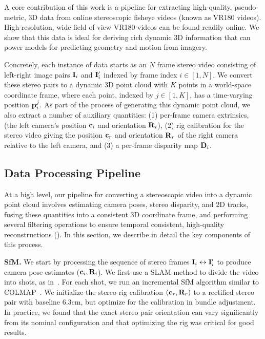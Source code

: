 A core contribution of this work is a pipeline for extracting high-quality, pseudo-metric, 3D data from online stereoscopic fisheye videos (known as VR180 videos). 
High-resolution, wide field of view VR180 videos can be found readily online.
We show that this data is ideal for deriving rich dynamic 3D information that can power models for predicting geometry and motion from imagery.

Concretely, each instance of data starts as an $N$ frame stereo video consisting of left-right image pairs $\mathbf{I}_i$ and $\mathbf{I}'_i$ indexed by frame index $i\in[1,N]$. We convert these stereo pairs to a dynamic 3D point cloud with $K$ points in a world-space coordinate frame, where each point, indexed by $j\in[1,K]$, has a time-varying position $\mathbf{p}_i^j$. 
As part of the process of generating this dynamic point cloud, we also extract a number of auxiliary quantities: (1) per-frame camera extrinsics, (the left camera's position $\mathbf{c}_i$ and orientation $\mathbf{R}_i$), (2) rig calibration for the stereo video giving the position $\mathbf{c}_r$ and orientation $\mathbf{R}_r$ of the right camera relative to the left camera, and (3) a per-frame disparity map $\mathbf{D}_i$.


\subsection{Data Processing Pipeline} 

At a high level, our pipeline for converting a stereoscopic video into a dynamic point cloud involves estimating camera poses, stereo disparity, and 2D tracks, fusing these quantities into a consistent 3D coordinate frame, and performing several filtering operations to ensure temporal consistent, high-quality reconstructions (). In this section, we describe in detail the key components of this process. %


\medskip
\noindent \textbf{SfM.} 
We start by processing the sequence of stereo frames $\mathbf{I}_i \leftrightarrow \mathbf{I}_i'$ to produce camera pose estimates ($\mathbf{c}_i, \mathbf{R}_i$). We first use a SLAM method to divide the video into shots, as in~\cite{zhou2017scene}. For each shot, we run an incremental SfM algorithm similar to COLMAP~\cite{schonberger2016structure}. We initialize the stereo rig calibration $(\mathbf{c}_r, \mathbf{R}_r)$ to a rectified stereo pair with baseline $6.3$cm, but optimize for the calibration in bundle adjustment. In practice, we found that the exact stereo pair orientation can vary significantly from its nominal configuration and that optimizing the rig was critical for good results. 

